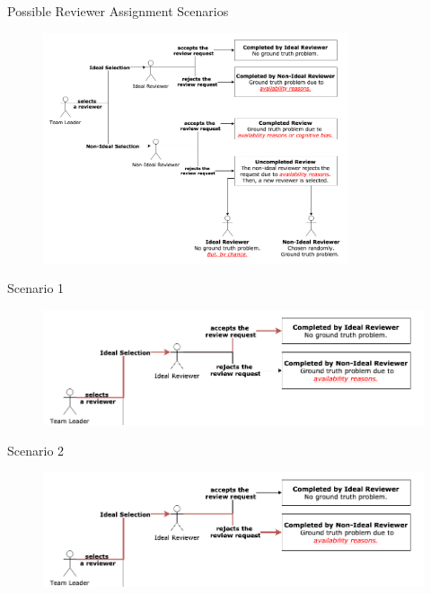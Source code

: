 \documentclass{beamer}
\begin{document}
\begin{frame}[noframenumbering]{\large Possible Reviewer Assignment Scenarios}
      \begin{figure}
      \includegraphics[width=0.8\textwidth]{img/scenarios_all.png}
      \end{figure}
\end{frame}
\begin{frame}[noframenumbering]{\large Scenario 1}
      \begin{figure}
      \includegraphics[width=1.05\textwidth]{img/scenarios_1.png}
      \end{figure}
\end{frame}
\begin{frame}[noframenumbering]{\large Scenario 2}
      \begin{figure}
      \includegraphics[width=1.05\textwidth]{img/scenarios_2.png}
      \end{figure}
\end{frame}
\end{document}
